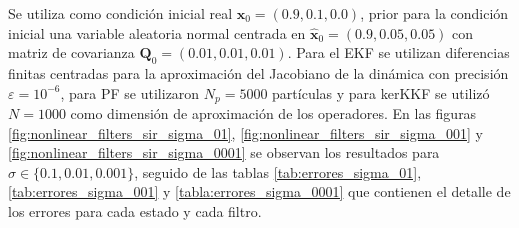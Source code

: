 Se utiliza como condición inicial real $\mathbf{x}_0 = (0.9, 0.1, 0.0)$, prior para la condición inicial una variable aleatoria normal centrada en $\hat{\mathbf{x}}_0 = (0.9, 0.05, 0.05)$ con matriz de covarianza $\mathbf{Q}_0 = (0.01, 0.01, 0.01)$. Para el EKF se utilizan diferencias finitas centradas para la aproximación del Jacobiano de la dinámica con precisión $\varepsilon=10^{-6}$, para PF se utilizaron $N_p = 5000$ partículas y para kerKKF se utilizó $N=1000$ como dimensión de aproximación de los operadores. En las figuras \ref{fig:nonlinear_filters_sir_sigma_01}, \ref{fig:nonlinear_filters_sir_sigma_001} y \ref{fig:nonlinear_filters_sir_sigma_0001} se observan los resultados para $\sigma \in \{0.1, 0.01, 0.001\}$, seguido de las tablas \ref{tab:errores_sigma_01}, \ref{tab:errores_sigma_001} y \ref{tabla:errores_sigma_0001} que contienen el detalle de los errores para cada estado y cada filtro.

